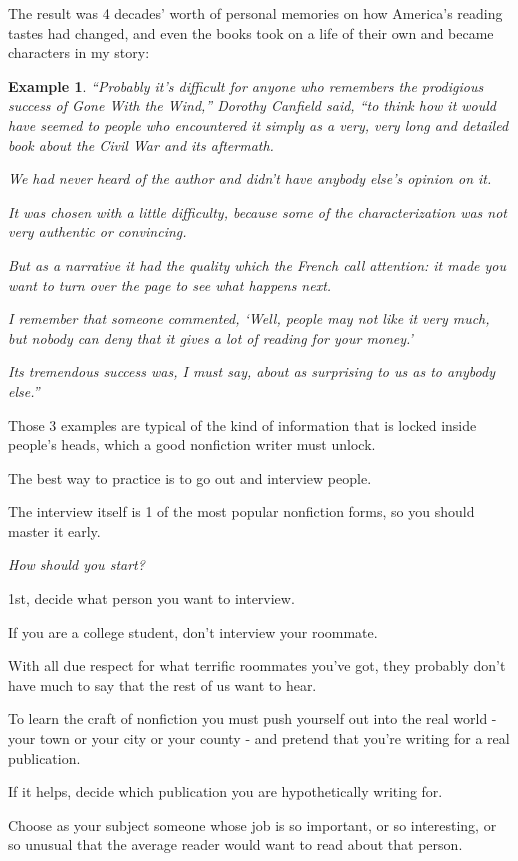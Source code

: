\documentclass{book}
\numberwithin{equation}{section}
\newtheorem{example}{Example}[chapter]
\begin{document}
The result was 4 decades' worth of personal memories on how America's reading tastes had changed, and even the books took on a life of their own and became characters in my story:
\begin{example}
    ``Probably it's difficult for anyone who remembers the prodigious success of \emph{Gone With the Wind},'' Dorothy Canfield said, ``to think how it would have seemed to people who encountered it simply as a very, very long and detailed book about the Civil War and its aftermath.
    
    We had never heard of the author and didn't have anybody else's opinion on it.
    
    It was chosen with a little difficulty, because some of the characterization was not very authentic or convincing.
    
    But as a narrative it had the quality which the French call \emph{attention}: it made you want to turn over the page to see what happens next.
    
    I remember that someone commented, `Well, people may not like it very much, but nobody can deny that it gives a lot of reading for your money.'
    
    Its tremendous success was, I must say, about as surprising to us as to anybody else.''
\end{example}
Those 3 examples are typical of the kind of information that is locked inside people's heads, which a good nonfiction writer must unlock.

The best way to practice is to go out and interview people.

The interview itself is 1 of the most popular nonfiction forms, so you should master it early.

%
\textit{How should you start?}

1st, decide what person you want to interview.

If you are a college student, don't interview your roommate.

With all due respect for what terrific roommates you've got, they probably don't have much to say that the rest of us want to hear.

To learn the craft of nonfiction you must push yourself out into the real world - your town or your city or your county - and pretend that you're writing for a real publication.

If it helps, decide which publication you are hypothetically writing for.

Choose as your subject someone whose job is so important, or so interesting, or so unusual that the average reader would want to read about that person.
\end{document}
